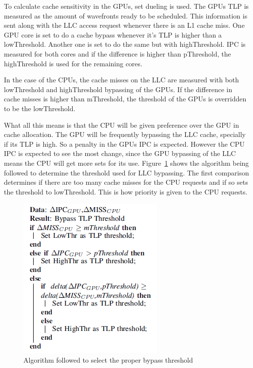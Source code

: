 \documentclass[10pt,journal,compsoc]{IEEEtran}
\begin{document}
To calculate cache sensitivity in the GPUs, set dueling is used. The GPUs TLP is measured as the amount of wavefronts ready to be scheduled. This information is sent along with the LLC access request whenever there is an L1 cache miss. One GPU core is set to do a cache bypass whenever it's TLP is higher than a lowThreshold. Another one is set to do the same but with highThreshold. IPC is measured for both cores and if the difference is higher than pThreshold, the highThreshold is used for the remaining cores.

In the case of the CPUs, the cache misses on the LLC are measured with both lowThreshold and highThreshold bypassing of the GPUs. If the difference in cache misses is higher than mThreshold, the threshold of the GPUs is overridden to be the lowThreshold.

What all this means is that the CPU will be given preference over the GPU in cache allocation. The GPU will be frequently bypassing the LLC cache, specially if its TLP is high. So a penalty in the GPUs IPC is expected. However the CPU IPC is expected to see the most change, since the GPU bypassing of the LLC means the CPU will get more sets for its use. Figure~\ref{fig:algo} shows the algorithm being followed to determine the threshold used for LLC bypassing. The first comparison determines if there are too many cache misses for the CPU requests and if so sets the threshold to lowThreshold. This is how priority is given to the CPU requests.

\begin{figure}
	\centering
	\includegraphics[width = 6 cm]{graphics/LLCalgo.png}
	\caption{Algorithm followed to select the proper bypass threshold\cite{LLC}}\label{fig:algo}
\end{figure} 
\end{document}
